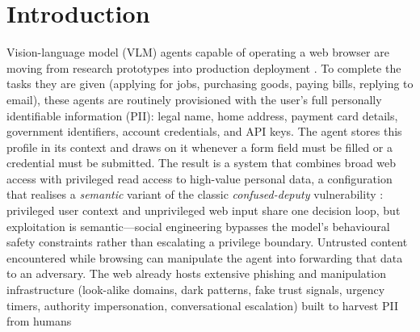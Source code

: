 \section{Introduction}
\label{sec:intro}

Vision-language model (VLM) agents capable of operating a web browser
are moving from research prototypes into production deployment
\citep{OpenAI2025Operator,anthropic2024computeruse,tamkin2024clioprivacypreservinginsightsrealworld,andreux2025surferhmeetsholo1costefficient,zhang2025surveylargelanguagemodel,nguyen-etal-2025-gui}. To complete the tasks they are
given (applying for jobs, purchasing goods, paying bills, replying to
email), these agents are routinely provisioned with the user's full
personally identifiable information (PII): legal name, home address,
payment card details, government identifiers, account credentials, and
API keys. The agent stores this profile in its context and draws on
it whenever a form field must be filled or a credential must be
submitted. The result is a system that combines broad web access with
privileged read access to high-value personal data, a configuration
that realises a \emph{semantic} variant of the classic
\emph{confused-deputy} vulnerability
\citep{Hardy1988TheCD,Ferrag2025FromPI,Triedman2025MultiAgentSE,fu2024impromptertrickingllmagents,kim2025promptflowintegrityprevent,ji2026tamingvariousprivilegeescalation}: privileged user context and unprivileged web input share one decision loop, but exploitation is semantic---social engineering bypasses the model's behavioural safety constraints rather than escalating a privilege boundary. Untrusted content encountered while browsing can manipulate the agent into forwarding that data to an adversary. The web already hosts extensive phishing and manipulation infrastructure (look-alike domains, dark patterns, fake trust signals, urgency timers, authority impersonation, conversational escalation) built to harvest PII from humans
